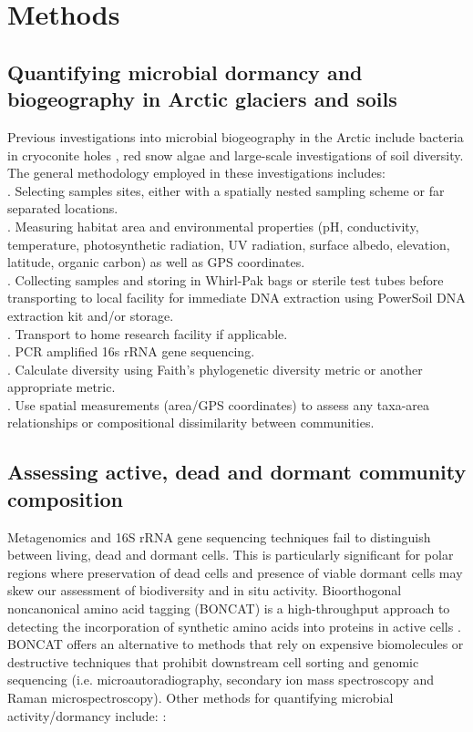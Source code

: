 \chapter{Methods}

\section{Quantifying microbial dormancy and biogeography in Arctic glaciers and soils}

Previous investigations into microbial biogeography in the Arctic include bacteria in cryoconite holes \cite{darcy2018island}, red snow algae \cite{lutz2016biogeography} and large-scale investigations of soil diversity. \\

\noindent The general methodology employed in these investigations includes:\\
. Selecting samples sites, either with a spatially nested sampling scheme or far separated locations.\\
. Measuring habitat area and environmental properties (pH, conductivity, temperature, photosynthetic radiation, UV radiation, surface albedo, elevation, latitude, organic carbon) as well as GPS coordinates.\\
. Collecting samples and storing in Whirl-Pak bags or sterile test tubes before transporting to local facility for immediate DNA extraction using PowerSoil DNA extraction kit and/or storage.\\
. Transport to home research facility if applicable.\\
. PCR amplified 16s rRNA gene sequencing. \\
. Calculate diversity using Faith's phylogenetic diversity metric or another appropriate metric.\\
. Use spatial measurements (area/GPS coordinates) to assess any taxa-area relationships or compositional dissimilarity between communities.\\

\section{Assessing active, dead and dormant community composition}

Metagenomics and 16S rRNA gene sequencing techniques fail to distinguish between living, dead and dormant cells. This is particularly significant for polar regions where preservation of dead cells and presence of viable dormant cells may skew our assessment of biodiversity and in situ activity. Bioorthogonal noncanonical amino acid tagging (BONCAT) is a high-throughput approach to detecting the incorporation of synthetic amino acids into proteins in active cells \cite{hatzenpichler2016visualizing}. BONCAT offers an alternative to methods that rely on expensive biomolecules or destructive techniques that prohibit downstream cell sorting and genomic sequencing (i.e. microautoradiography, secondary ion mass spectroscopy and Raman microspectroscopy). Other methods for quantifying microbial activity/dormancy include: \cite{burkert2019changes}:\\

